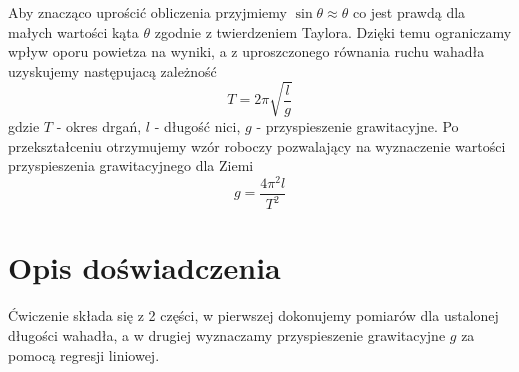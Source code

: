 \documentclass[a4paper,10pt,twoside]{article}
\begin{document}
	Aby znacząco uprościć obliczenia przyjmiemy $\sin\theta\approx\theta$ co jest prawdą dla małych wartości kąta $\theta$ zgodnie z
	twierdzeniem Taylora. Dzięki temu ograniczamy wpływ oporu powietza na wyniki, a z uproszczonego równania ruchu wahadła
	uzyskujemy następujacą zależność
	\begin{equation}
	T=2\pi\sqrt{\frac{l}{g}}
	\end{equation}
	gdzie $T$ - okres drgań, $l$ - długość nici, $g$ - przyspieszenie grawitacyjne. Po przekształceniu otrzymujemy wzór roboczy pozwalający
	na wyznaczenie wartości przyspieszenia grawitacyjnego dla Ziemi
	\begin{equation}
	\label{eq:working_g}
	g=\frac{4\pi^2l}{T^2}
	\end{equation}
	
	\section{Opis doświadczenia}
	

	Ćwiczenie składa się z 2 części, w pierwszej dokonujemy pomiarów dla ustalonej długości wahadła, a w drugiej wyznaczamy
	przyspieszenie grawitacyjne $g$ za pomocą regresji liniowej.
	
\end{document}
